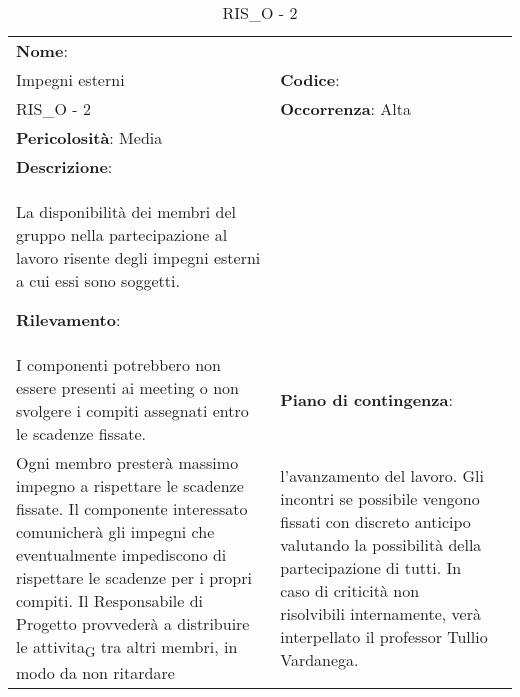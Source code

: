 \renewcommand{\arraystretch}{1.5}
\begin{longtable} { 
		>{\raggedright}p{} 
		>{\raggedright}p{} 
		>{\raggedright}p{}    }
	
	\caption{RIS\_O - 2 } \endhead	
	
	
	\textbf{Nome}: \\ Impegni esterni 
	& \textbf{Codice}: \\ RIS\_O - 2
	& \textbf{Occorrenza}: Alta \\ \textbf{Pericolosità}: Media
	
	\tabularnewline
	
	\textbf{Descrizione}: \\ La disponibilità dei membri del gruppo nella partecipazione al lavoro risente degli impegni esterni a cui essi sono soggetti.
	
	\textbf{Rilevamento}: \\ I componenti potrebbero non essere presenti ai meeting o non svolgere i compiti assegnati entro le scadenze fissate.
	
	& 
	\textbf{Piano di contingenza}: \\ Ogni membro presterà massimo impegno a rispettare le scadenze fissate. Il componente interessato comunicherà gli impegni che eventualmente impediscono di rispettare le scadenze per i propri compiti. Il Responsabile di Progetto provvederà a distribuire le \gls{attivita}\textsubscript{G} tra altri membri, in modo da non ritardare	
	& 
	l'avanzamento del lavoro. Gli incontri se possibile vengono fissati con discreto anticipo valutando la possibilità della partecipazione di tutti. 
	In caso di criticità non risolvibili internamente, verà interpellato il professor Tullio Vardanega.
	
	
\end{longtable}



